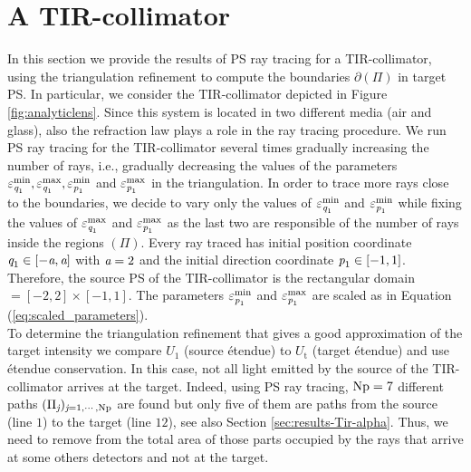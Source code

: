 \section{A TIR-collimator}
In this section we provide the results of PS ray tracing for a TIR-collimator, using the triangulation refinement to compute the boundaries $\partial$$(\Pi)$ in target PS. In particular, we consider the TIR-collimator depicted in Figure \ref{fig:analyticlens}. Since this system is located in two different media (air and glass), also the refraction law plays a role in the ray tracing procedure. We run PS ray tracing for the TIR-collimator several times gradually increasing the number of rays, i.e., gradually decreasing the values of the parameters $\varepsilon_{\textit{q}_1}^{\textrm{min}}, \varepsilon_{\textit{q}_1}^{\textrm{max}}, \varepsilon_{\textit{p}_1}^{\textrm{min}}$ and $\varepsilon_{\textit{p}_1}^{\textrm{max}}$ in the triangulation. In order to trace more rays close to the boundaries, we decide to vary only the values of $\varepsilon_{\textit{q}_1}^{\textrm{min}}$ and $ \varepsilon_{\textit{p}_1}^{\textrm{min}}$ while fixing the values of $ \varepsilon_{\textit{q}_1}^{\textrm{max}}$ and $ \varepsilon_{\textit{p}_1}^{\textrm{max}}$ as the last two are responsible of the number of rays inside the regions $(\Pi)$. Every ray traced has initial position coordinate $\textit{q}_1\in[-\textit{a}, \textit{a}]$ with $\textit{a}=2$ and the initial direction coordinate $\textit{p}_1\in[-1,1]$. Therefore, the source PS of the TIR-collimator is the rectangular domain $= [-2, 2] \times [-1, 1]$. The parameters $\varepsilon_{\textit{p}_1}^{\textrm{min}}$ and $\varepsilon_{\textit{p}_1}^{\textrm{max}}$ are scaled as in Equation (\ref{eq:scaled_parameters}).
\\ \indent To determine the triangulation refinement that gives a good approximation of the target intensity we compare $U_1$ (source \'{e}tendue) to $U_{\textrm{t}}$ (target \'{e}tendue) and use \'{e}tendue conservation. In this case, not all light emitted by the source of the TIR-collimator arrives at the target. Indeed, using PS ray tracing, $\textrm{Np}=7$ different paths $(\Pi_{\textit{j}})_{\textit{j}=1, \cdots, \textrm{Np}}$ are found but only five of them are paths from the source (line $1$) to the target (line $12$), see also Section \ref{sec:results-Tir-alpha}. Thus, we need to remove from the total area of  those parts occupied by the rays that arrive at some others detectors and not at the target. %
